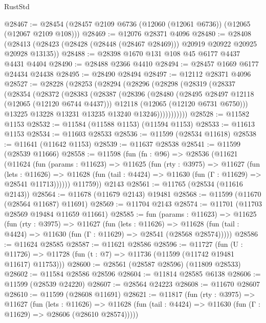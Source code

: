 \begin{lexlean}{RustStd}
\begin{coremodule}
@28467 := @28454 (@28457 @2109 @6736 (@12060 (@12061 @6736)) (@12065 (@12067 @2109 @108)))
@28469 := @12076 @28371 @4096
@28480 := @28408
    (@28413 (@28423 (@28428 (@28448 (@28467 @28469))) @20919 @20922 @20925 @20928 @13135))
@28488 := @28398 @1670 @131 @108 @45 @6177 @4437 @4431 @4404
@28490 := @28488 @2366 @4410
@28494 := @28457 @1669 @6177 @24434 @24438
@28495 := @28490 @28494
@28497 := @12112 @28371 @4096
@28527 := @28228
    (@28253
      (@28294
        (@28296
          (@28298
            (@28319
              (@28337
                (@28354
                  (@28372
                    (@28383
                      (@28387
                        (@28396
                          (@28480
                            (@28495 @28497 @12118 (@12065 (@12120 @6744 @4437)))
                            @12118
                            (@12065 (@12120 @6731 @6750)))
                          @13225
                          @13228
                          @13231
                          @13235
                          @13240
                          @13246)))))))))))
@28528 := @11582 @1153
@28532 := @11584 (@11588 @1153) (@11594 @1153)
@28533 := @11613 @1153
@28534 := @11603 @28533
@28536 := @11599 (@28534 @11618)
@28538 := @11641 (@11642 @1153)
@28539 := @11637 @28538
@28541 := @11599 (@28539 @11666)
@28558 := @11598
    (fun (fn : @96) =>
    @28536
      (@11621
        (@11624
          (fun (params : @11623) =>
          @11625
            (fun (rty : @3975) =>
            @11627
              (fun (lets : @11626) =>
              @11628 (fun (tail : @4424) => @11630 (fun (Γ : @11629) => @28541 @11713))))))
        @11759))
    @2143
@28561 := @11765 (@28534 (@11616 @2143))
@28564 := @11678 (@11679 @2143) @19481
@28568 := @11599 (@11670 (@28564 @11687) @11691)
@28569 := @11704 @2143
@28574 := @11701 (@11703 @28569 @19484 @11659 @11661)
@28585 := fun (params : @11623) =>
  @11625
    (fun (rty : @3975) =>
    @11627
      (fun (lets : @11626) =>
      @11628 (fun (tail : @4424) => @11630 (fun (Γ : @11629) => @28541 (@28568 @28574)))))
@28586 := @11624 @28585
@28587 := @11621 @28586
@28596 := @11727
    (fun (U : @11726) => @11728 (fun (t : @7) => @11736 (@11599 (@11742 @19481 @11617) @11753)))
@28600 := @28561 (@28587 @28596) (@11809 @28533)
@28602 := @11584 @28586 @28596
@28604 := @11814 @28585 @6138
@28606 := @11599 (@28539 @24220)
@28607 := @28564 @24223
@28608 := @11670 @28607
@28610 := @11599 (@28608 @11691)
@28621 := @11817
    (fun (rty : @3975) =>
    @11627
      (fun (lets : @11626) =>
      @11628 (fun (tail : @4424) => @11630 (fun (Γ : @11629) => @28606 (@28610 @28574)))))

\end{coremodule}
\end{lexlean}
